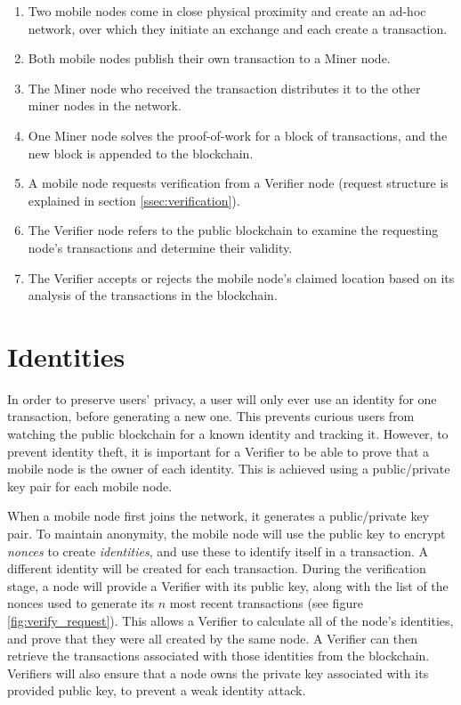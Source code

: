 \vspace{-1cm}
\begin{enumerate}[label=\textbf{\arabic*}.]
\item Two mobile nodes come in close physical proximity and create an ad-hoc network, over which they initiate an exchange and each create a transaction.
\item Both mobile nodes publish their own transaction to a Miner node.
\item The Miner node who received the transaction distributes it to the other miner nodes in the network.
\item One Miner node solves the proof-of-work for a block of transactions, and the new block is appended to the blockchain.
\item A mobile node requests verification from a Verifier node (request structure is explained in section \ref{ssec:verification}).
\item The Verifier node refers to the public blockchain to examine the requesting node's transactions and determine their validity.
\item The Verifier accepts or rejects the  mobile node's claimed location based on its analysis of the transactions in the blockchain. 
\end{enumerate}

\section{Identities}
In order to preserve users' privacy, a user will only ever use an identity for one transaction, before generating a new one. This prevents curious users from watching the public blockchain for a known identity and tracking it. However, to prevent identity theft, it is important for a Verifier to be able to prove that a mobile node is the owner of each identity. This is achieved using a public/private key pair for each mobile node.

When a mobile node first joins the network, it generates a public/private key pair. To maintain anonymity, the mobile node will use the public key to encrypt \textit{nonces} to create \textit{identities}, and use these to identify itself in a transaction. A different identity will be created for each transaction. During the verification stage, a node will provide a Verifier with its public key, along with the list of the nonces used to generate its $n$ most recent transactions (see figure \ref{fig:verify_request}). This allows a Verifier to calculate all of the node's identities, and prove that they were all created by the same node. A Verifier can then retrieve the transactions associated with those identities from the blockchain. Verifiers will also ensure that a node owns the private key associated with its provided public key, to prevent a weak identity attack.

